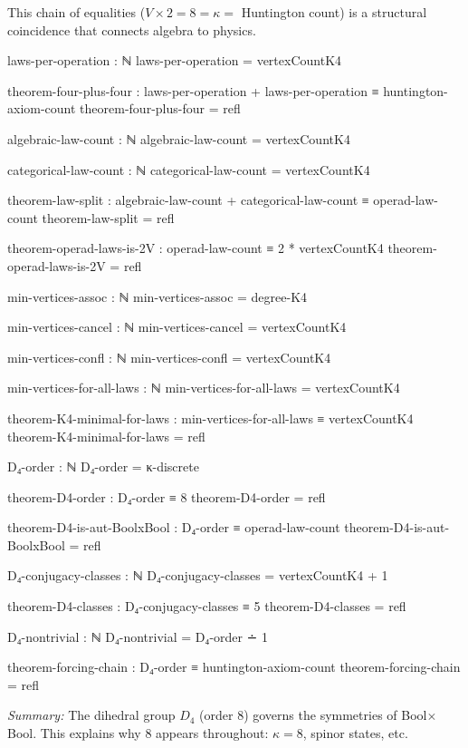 \documentclass[11pt,a4paper]{book}
\begin{document}
This chain of equalities ($V \times 2 = 8 = \kappa = $ Huntington count) is a structural 
coincidence that connects algebra to physics.

\begin{code}
laws-per-operation : ℕ
laws-per-operation = vertexCountK4

theorem-four-plus-four : laws-per-operation + laws-per-operation ≡ huntington-axiom-count
theorem-four-plus-four = refl

algebraic-law-count : ℕ
algebraic-law-count = vertexCountK4

categorical-law-count : ℕ
categorical-law-count = vertexCountK4

theorem-law-split : algebraic-law-count + categorical-law-count ≡ operad-law-count
theorem-law-split = refl

theorem-operad-laws-is-2V : operad-law-count ≡ 2 * vertexCountK4
theorem-operad-laws-is-2V = refl

min-vertices-assoc : ℕ
min-vertices-assoc = degree-K4

min-vertices-cancel : ℕ
min-vertices-cancel = vertexCountK4

min-vertices-confl : ℕ
min-vertices-confl = vertexCountK4

min-vertices-for-all-laws : ℕ
min-vertices-for-all-laws = vertexCountK4

theorem-K4-minimal-for-laws : min-vertices-for-all-laws ≡ vertexCountK4
theorem-K4-minimal-for-laws = refl

D₄-order : ℕ
D₄-order = κ-discrete

theorem-D4-order : D₄-order ≡ 8
theorem-D4-order = refl

theorem-D4-is-aut-BoolxBool : D₄-order ≡ operad-law-count
theorem-D4-is-aut-BoolxBool = refl

D₄-conjugacy-classes : ℕ
D₄-conjugacy-classes = vertexCountK4 + 1

theorem-D4-classes : D₄-conjugacy-classes ≡ 5
theorem-D4-classes = refl

D₄-nontrivial : ℕ
D₄-nontrivial = D₄-order ∸ 1

theorem-forcing-chain : D₄-order ≡ huntington-axiom-count
theorem-forcing-chain = refl
\end{code}

\medskip
\noindent\textit{Summary:} The dihedral group $D_4$ (order 8) governs the symmetries of 
Bool$\times$Bool. This explains why 8 appears throughout: $\kappa = 8$, spinor states, etc.

\end{document}
